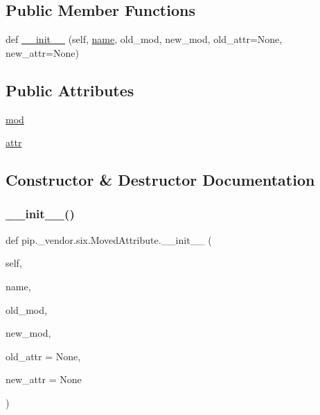 \subsection*{Public Member Functions}
\begin{DoxyCompactItemize}
\item 
def \hyperlink{classpip_1_1__vendor_1_1six_1_1MovedAttribute_ac7ad30e02e07c086b32adfbf4111c333}{\+\_\+\+\_\+init\+\_\+\+\_\+} (self, \hyperlink{classpip_1_1__vendor_1_1six_1_1__LazyDescr_ac79dd785588d4b38378ddb12da59caf2}{name}, old\+\_\+mod, new\+\_\+mod, old\+\_\+attr=None, new\+\_\+attr=None)
\end{DoxyCompactItemize}
\subsection*{Public Attributes}
\begin{DoxyCompactItemize}
\item 
\hyperlink{classpip_1_1__vendor_1_1six_1_1MovedAttribute_a610b47fdb1733f195ac9ba77720c3c82}{mod}
\item 
\hyperlink{classpip_1_1__vendor_1_1six_1_1MovedAttribute_a77ede65ccbc7127996b4f0b1cdf522ad}{attr}
\end{DoxyCompactItemize}


\subsection{Constructor \& Destructor Documentation}
\mbox{\label{classpip_1_1__vendor_1_1six_1_1MovedAttribute_ac7ad30e02e07c086b32adfbf4111c333}} 
\subsubsection{\texorpdfstring{\+\_\+\+\_\+init\+\_\+\+\_\+()}{\_\_init\_\_()}}
{\footnotesize\ttfamily def pip.\+\_\+vendor.\+six.\+Moved\+Attribute.\+\_\+\+\_\+init\+\_\+\+\_\+ (\begin{DoxyParamCaption}\item[{}]{self,  }\item[{}]{name,  }\item[{}]{old\+\_\+mod,  }\item[{}]{new\+\_\+mod,  }\item[{}]{old\+\_\+attr = {\ttfamily None},  }\item[{}]{new\+\_\+attr = {\ttfamily None} }\end{DoxyParamCaption})}



